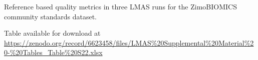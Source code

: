 \begin{table}[]
\centering
\caption{Reference based quality metrics in three LMAS runs for the ZimoBIOMICS community standards dataset.}
\label{tab:ch5_suptable22}
Table available for download at \url{https://zenodo.org/record/6623458/files/LMAS\%20Supplemental\%20Material\%20-\%20Tables_Table\%20S22.xlsx}
\end{table}